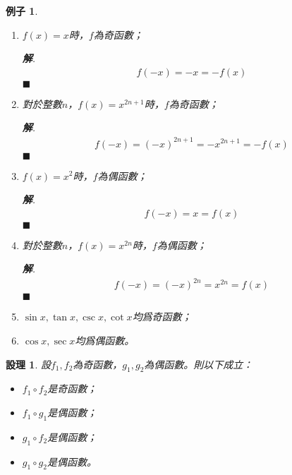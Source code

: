 \documentclass[12pt]{article}
\newtheorem*{proposition}{設理}
\newtheorem*{example}{例子}
\newenvironment*{sol}{\par \textbf{解}.}{\hfill$\blacksquare$}
\begin{document}
    \begin{example}
        \begin{enumerate}
            \item $f(x)=x$時，$f$為奇函數；\begin{sol}
                \begin{align*}
                    f(-x)=-x=-f(x)
                \end{align*}
            \end{sol}
            \item 對於整數$n$，$f(x)=x^{2n+1}$時，$f$為奇函數；\begin{sol}
                \begin{align*}
                    f(-x)=(-x)^{2n+1}=-x^{2n+1}=-f(x)
                \end{align*}
            \end{sol}
            \item $f(x)=x^2$時，$f$為偶函數；\begin{sol}
                \begin{align*}
                    f(-x)=x=f(x)
                \end{align*}
            \end{sol}
            \item 對於整數$n$，$f(x)=x^{2n}$時，$f$為偶函數；\begin{sol}
                \begin{align*}
                    f(-x)=(-x)^{2n}=x^{2n}=f(x)
                \end{align*}
            \end{sol}
            \item $\sin{x},\tan{x},\csc{x},\cot{x}$均爲奇函數；
            \item $\cos{x},\sec{x}$均爲偶函數。
        \end{enumerate}
    \end{example}

    \begin{proposition}
        設$f_1,f_2$為奇函數，$g_1,g_2$為偶函數。則以下成立：\begin{itemize}
            \item $f_1\circ f_2$是奇函數；
            \item $f_1\circ g_1$是偶函數；
            \item $g_1\circ f_2$是偶函數；
            \item $g_1\circ g_2$是偶函數。
        \end{itemize}
    \end{proposition}
\end{document}
